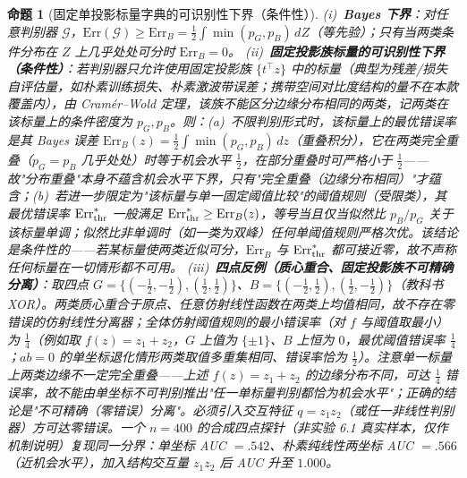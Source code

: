 \documentclass[fontset=windows,11pt]{ctexart}
\newtheorem{proposition}{命题}[section]
\numberwithin{equation}{section}
\begin{document}
\begin{proposition}[固定单投影标量字典的可识别性下界（条件性）]\label{prop:bayes}
(i)~\textbf{Bayes 下界}：对任意判别器 $\mathcal G$，$\mathrm{Err}(\mathcal G)\ge\mathrm{Err}_B=\tfrac12\int\min(p_G,p_B)\,dZ$（等先验）；只有当两类条件分布在 $Z$ 上几乎处处可分时 $\mathrm{Err}_B=0$。
(ii)~\textbf{固定投影族标量的可识别性下界（条件性）}：若判别器只允许使用固定投影族 $\{t^\top z\}$ 中的标量（典型为残差/损失自评估量，如朴素训练损失、朴素激波带误差；携带空间对比度结构的量不在本款覆盖内），由 Cram\'er--Wold 定理，该族不能区分边缘分布相同的两类，记两类在该标量上的条件密度为 $p_G,p_B$。则：(a)~不限判别形式时，该标量上的最优错误率是其 Bayes 误差 $\mathrm{Err}_B(z)=\tfrac12\int\min(p_G,p_B)\,dz$（重叠积分），它在两类\emph{完全重叠}（$p_G=p_B$ 几乎处处）时等于机会水平 $\tfrac12$，在\emph{部分重叠}时可严格小于 $\tfrac12$——故"分布重叠"本身\emph{不}蕴含机会水平下界，只有"完全重叠（边缘分布相同）"才蕴含；(b)~若进一步限定为"该标量与单一固定阈值比较"的\emph{阈值规则}（受限类），其最优错误率 $\mathrm{Err}_{\rm thr}^*$ 一般满足 $\mathrm{Err}_{\rm thr}^*\ge\mathrm{Err}_B(z)$，等号当且仅当似然比 $p_B/p_G$ 关于该标量单调；似然比非单调时（如一类为双峰）任何单阈值规则严格次优。该结论是条件性的——若某标量使两类近似可分，$\mathrm{Err}_B$ 与 $\mathrm{Err}_{\rm thr}^*$ 都可接近零，故不声称任何标量在一切情形都不可用。
(iii)~\textbf{四点反例（质心重合、固定投影族不可精确分离）}：取四点 $G=\{(-\tfrac12,-\tfrac12),(\tfrac12,\tfrac12)\}$、$B=\{(-\tfrac12,\tfrac12),(\tfrac12,-\tfrac12)\}$（教科书 XOR）。两类质心重合于原点、任意仿射线性函数在两类上均值相同，故\emph{不存在零错误的仿射线性分离器}；全体仿射阈值规则的最小错误率（对 $f$ 与阈值取最小）为 $\tfrac14$（例如取 $f(z)=z_1+z_2$，$G$ 上值为 $\{\pm1\}$、$B$ 上恒为 $0$，最优阈值错误率 $\tfrac14$；$ab=0$ 的单坐标退化情形两类取值多重集相同、错误率恰为 $\tfrac12$）。注意单一标量上两类边缘\emph{不一定}完全重叠——上述 $f(z)=z_1+z_2$ 的边缘分布不同，可达 $\tfrac14$ 错误率，故不能由单坐标不可判别推出"任一单标量判别都恰为机会水平"；正确的结论是"不可精确（零错误）分离"。必须引入交互特征 $q=z_1z_2$（或任一非线性判别器）方可达零错误。一个 $n=400$ 的\emph{合成四点探针}（非实验 6.1 真实样本，仅作机制说明）复现同一分界：单坐标 AUC $=.542$、朴素\emph{纯线性}两坐标 AUC $=.566$（近机会水平），加入结构交互量 $z_1z_2$ 后 AUC 升至 $1.000$。
\end{proposition}
\end{document}
